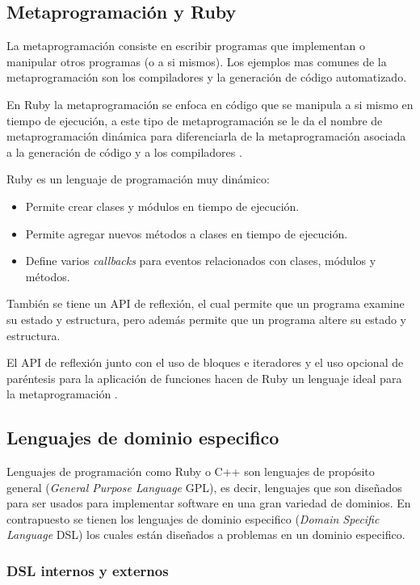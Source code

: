 \subsection{Metaprogramación y Ruby}
La metaprogramación consiste en escribir programas que implementan o manipular otros
programas (o a si mismos). Los ejemplos mas comunes de la metaprogramación son los
compiladores y la generación de código automatizado.

En Ruby la metaprogramación se enfoca en código que se manipula a si mismo en tiempo
de ejecución, a este tipo de metaprogramación se le da el nombre de metaprogramación
dinámica para diferenciarla de la metaprogramación asociada a la generación de
código y a los compiladores \cite{2_perrotta_2010}.

Ruby es un lenguaje de programación muy dinámico:
\begin{itemize}
\item Permite crear clases y módulos en tiempo de ejecución.
\item Permite agregar nuevos métodos a clases en tiempo de ejecución.
\item Define varios \textit{callbacks} para eventos relacionados con clases, módulos
  y métodos.
\end{itemize}
También se tiene un API de reflexión, el cual permite que un programa examine su estado y estructura, pero además permite que un programa altere su estado y estructura.

El API de reflexión junto con el uso de bloques e iteradores y el uso opcional de
paréntesis para la aplicación de funciones hacen de Ruby un lenguaje
ideal para la metaprogramación \cite{24_matsumoto_2008}.

\subsection{Lenguajes de dominio especifico}
Lenguajes de programación como Ruby o C++ son lenguajes de propósito general
(\textit{General Purpose Language} GPL), es decir, lenguajes que son diseñados
para ser usados para implementar software en una gran variedad de dominios.
En contrapuesto se tienen los lenguajes de dominio especifico
(\textit{Domain Specific Language} DSL) los cuales están diseñados a problemas en
un dominio especifico.

\subsubsection{DSL internos y externos}

